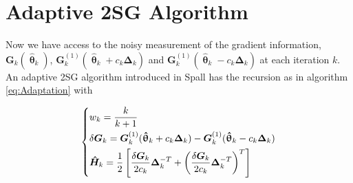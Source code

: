 \documentclass[conference]{IEEEtran}
\newcommand{\bG}{\bm{G}}
\newcommand{\bDelta}{\bm{\Delta}}
\newcommand{\oH}{\bm{\overline{H}}}
\newcommand{\hH}{\bm{\hat{H}}}
\newcommand{\htheta}{\bm{\hat{\uptheta}}}
\newcommand{\tDelta}{\bm{\tilde{\Delta}}}
\newcommand{\remove}[1]{}
\begin{document}
\remove{
We can obtain a rank-2 update from $ \oH_{k-1}^{-1} $ to $ \oH_{k}^{-1} $. The sequential recursion of the $ \oH_k^{-1} $ is as following:
\begin{equation} \label{eq:Enhanced2SPSASequentialUpdate}
\begin{dcases}
	\bm{B}_k^{-1}
	&=\oH_{k-1}^{-1}-\oH_{k-1}^{-1}\tDelta_k^{-1}\\
	&~~~\cdot(b_k^{-1}+\bDelta_k^{-T}\oH_{k-1}^{-1}\tDelta_k^{-1})^{-1}\bDelta_k^{-T}\oH_{k-1}^{-1}\\%
    \oH_k^{-1}
    &=\bm{B}_k^{-1}-\bm{B}_k^{-1}\bDelta_k^{-1}\\
    &~~~\cdot(b_k^{-1}+\tDelta_k^{-T}\bm{B}_k^{-1}\bDelta_k^{-1})^{-1}\tDelta_k^{-T}\bm{B}_k^{-1}
\end{dcases}
\end{equation}
where
\begin{equation} \label{eq:Enhanced2SPSAB}
\bm{B}_k=\oH_{k-1}+b_k\tDelta_k^{-1}\bDelta_k^{-T}
\end{equation}

Now we analyze the FLOPs of the sequential update \ref{eq:Enhanced2SPSASequentialUpdate}, compared with the original algorithm \ref{eq:Enhancement}:
}






\section{Adaptive 2SG Algorithm} \label{2SG}
Now we have access to the noisy measurement of the gradient information, $\bG_k(\htheta_k)$, $\bG_k^{(1)}(\htheta_k+ c_k\bDelta_k)$ and $\bG_k^{(1)}(\htheta_k- c_k\bDelta_k)$ at each iteration $k$. An adaptive 2SG algorithm introduced in Spall \cite{Spall2000} has the recursion as in algorithm \ref{eq:Adaptation} with

\begin{equation} \label{eq:notationSG}
\begin{dcases}
w_k=\frac{k}{k+1}\\
\delta\bG_k=\bG_k^{(1)}(\htheta_k+ c_k\bDelta_k)-\bG_k^{(1)}(\htheta_k- c_k\bDelta_k)\\
\hH_k=\frac{1}{2}\left[ \frac{\delta\bG_k}{2c_k}\bDelta_k^{-T}+\left(\frac{\delta\bG_k}{2c_k}\bDelta_k^{-T}\right)^T \right]\\
\end{dcases}
\end{equation}
\end{document}
